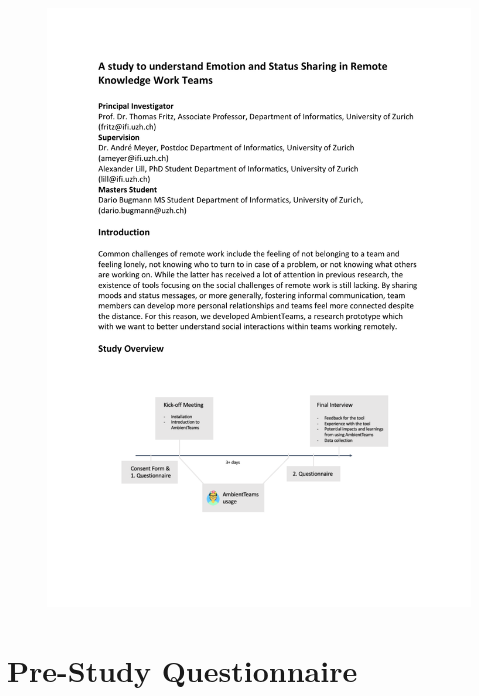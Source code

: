 \begin{figure}[h]
    \centering
    \includegraphics[width=\linewidth, page=4]{./documents/study_instructions.pdf}
\end{figure}

\chapter{Pre-Study Questionnaire}
\label{chapter:prestudy_questionnaire}

